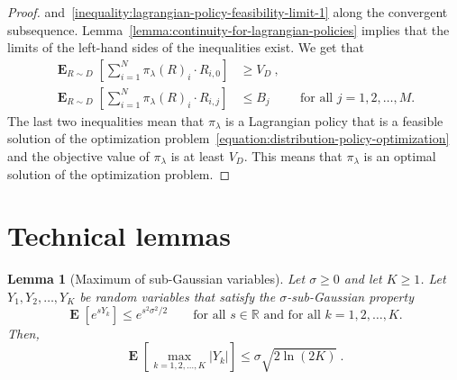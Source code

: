 \documentclass[12pt]{article}
\newcommand{\R}{\mathbb{R}}
\DeclareMathOperator*{\Exp}{\mathbf{E}}
\newtheorem{lemma}[theorem]{Lemma}
\theoremstyle{definition}
\begin{document}
\begin{proof}
and~\eqref{inequality:lagrangian-policy-feasibility-limit-1} along the
convergent subsequence. Lemma~\ref{lemma:continuity-for-lagrangian-policies}
implies that the limits of the left-hand sides of the inequalities exist. We get
that
\begin{align}
\label{inequality:lagrangian-policy-optimality-limit-2}
\Exp_{R \sim D} \left[ \sum_{i=1}^N \pi_\lambda(R)_i \cdot R_{i,0}  \right] & \ge V_D \: , \\
\label{inequality:lagrangian-policy-feasibility-limit-2}
\Exp_{R \sim D} \left[ \sum_{i=1}^N \pi_\lambda(R)_i \cdot R_{i,j}  \right] & \le B_j
&& \text{for all $j=1,2,\dots,M$.}
\end{align}
The last two inequalities mean that $\pi_\lambda$ is a Lagrangian policy that is
a feasible solution of the optimization
problem~\eqref{equation:distribution-policy-optimization} and the objective
value of $\pi_\lambda$ is at least $V_D$. This means that $\pi_\lambda$ is an
optimal solution of the optimization problem.
\end{proof}

\appendix

\section{Technical lemmas}

\begin{lemma}[Maximum of sub-Gaussian variables]
\label{lemma:maximum-of-sub-gaussian-variables}
Let $\sigma \ge 0$ and let $K \ge 1$. Let $Y_1, Y_2, \dots, Y_K$ be random
variables that satisfy the $\sigma$-sub-Gaussian property
$$
\Exp\left[ e^{sY_k} \right] \le e^{s^2\sigma^2/2} \qquad \text{for all $s \in \R$ and for all $k=1,2,\dots,K$.}
$$
Then,
$$
\Exp\left[ \max_{k=1,2,\dots,K} |Y_k| \right] \le \sigma \sqrt{2 \ln(2K)} \: .
$$
\end{lemma}
\end{document}
